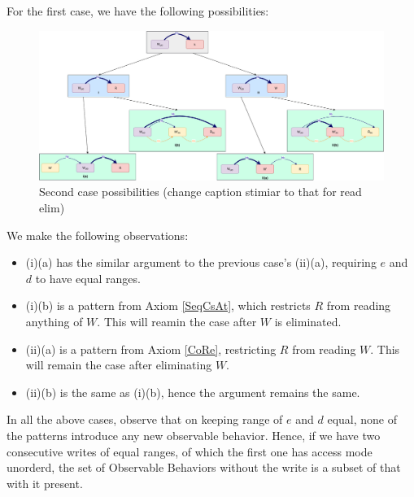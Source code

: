     For the first case, we have the following possibilities:
    \begin{figure}[H]
        \centering
        \includegraphics[scale=0.3]{Elimination/1.ValidEliminationCandidate/WriteElimProof/ProofParts/Part4Case2.pdf}
        \caption{Second case possibilities (change caption stimiar to that for read elim)}
    \end{figure}

    We make the following observations:
    \begin{itemize}
        \item (i)(a) has the similar argument to the previous case's (ii)(a), requiring $e$ and $d$ to have equal ranges.
        \item (i)(b) is a pattern from Axiom \ref{SeqCsAt}, which restricts $R$ from reading anything of $W$. This will reamin the case after $W$ is eliminated. 
        \item (ii)(a) is a pattern from Axiom \ref{CoRe}, restricting $R$ from reading $W$. This will remain the case after eliminating $W$.
        \item (ii)(b) is the same as (i)(b), hence the argument remains the same.  
    \end{itemize}

    In all the above cases, observe that on keeping range of $e$ and $d$ equal, none of the patterns introduce any new observable behavior. Hence, if we have two consecutive writes of equal ranges, of which the first one has access mode unorderd, the set of Observable Behaviors without the write is a subset of that with it present. 

